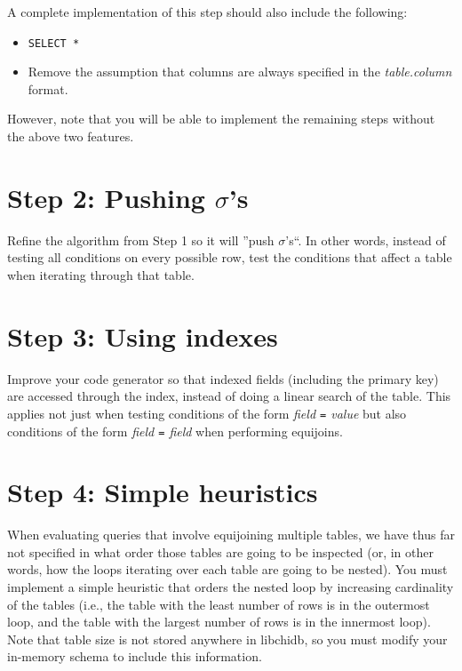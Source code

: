 \documentclass[10pt]{article}
\begin{document}
A complete implementation of this step should also include the following:

\begin{itemize}
\item \texttt{SELECT *}
\item Remove the assumption that columns are always specified in the \emph{table.column} format.
\end{itemize}

However, note that you will be able to implement the remaining steps without the above two features.


\section*{Step 2: Pushing $\sigma$'s}

Refine the algorithm from Step 1 so it will ''push $\sigma$'s``. In other words, instead of testing all conditions on every possible row, test the conditions that affect a table when iterating through that table.

\section*{Step 3: Using indexes}

Improve your code generator so that indexed fields (including the primary key) are accessed through the index, instead of doing a linear search of the table. This applies not just when testing conditions of the form \emph{field \texttt{=} value} but also conditions of the form \emph{field \texttt{=} field} when performing equijoins.

\section*{Step 4: Simple heuristics}

When evaluating queries that involve equijoining multiple tables, we have thus far not specified in what order those tables are going to be inspected (or, in other words, how the loops iterating over each table are going to be nested). You must implement a simple heuristic that orders the nested loop by increasing cardinality of the tables (i.e., the table with the least number of rows is in the outermost loop, and the table with the largest number of rows is in the innermost loop). Note that table size is not stored anywhere in \textsf{libchidb}, so you must modify your in-memory schema to include this information.
\end{document}
